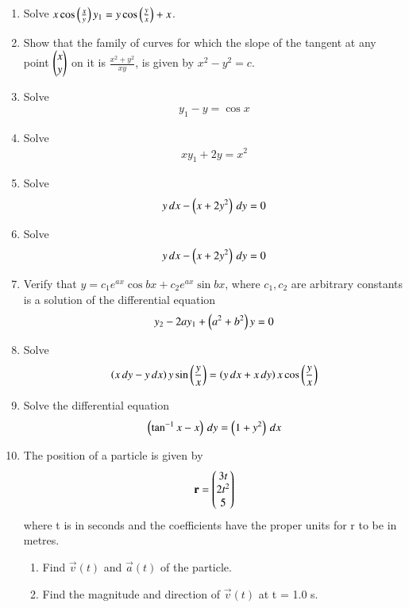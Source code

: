 \begin{enumerate}[label=\arabic*.,ref=\thesubsection.\theenumi]
\item Solve $x \cos\left(\frac{x}{y}\right)y_1 = y\cos\left(\frac{y}{x}\right)+x$.
\item Show that the family of curves for which the slope of the tangent at any point $\begin{pmatrix}x\\y\end{pmatrix}$ on it is $\frac{x^2+y^2}{xy}$, is given by $x^2-y^2 = c$.
%
%
\item Solve 
%
\begin{align}
y_1  - y = \cos x
\end{align}
%
\item Solve 
%
\begin{align}
xy_1  + 2y = x^2
\end{align}
%
\item Solve
%
\begin{align}
y\, dx - \left(x+2y^2\right)\, dy = 0
\end{align}
%
\item Solve
%
\begin{align}
y\, dx - \left(x+2y^2\right)\, dy = 0
\end{align}
%
\item Verify that $y = c_1e^{ax}\cos bx + c_2 e^{ax}\sin bx$, where $c_1,c_2$ are arbitrary constants is a solution of the differential equation
%
\begin{align}
y_2 - 2ay_1 +\left(a^2+b^2\right) y = 0
\end{align}
%
\item Solve
%
\begin{align}
\left(x\,dy-y\,dx\right)y\sin\left(\frac{y}{x}\right) = \left(y\, dx + x\, dy\right)x\cos\left(\frac{y}{x}\right)
\end{align}
%
\item Solve the differential equation
%
\begin{align}
\left(\tan^{-1}x - x\right)\, dy = \left(1+y^2\right)\, dx
\end{align}
\item The position of a particle is given by
\begin{align}
\mathbf{r} = \begin{pmatrix}3t\\2t^2\\5\end{pmatrix}
\end{align}
where t is in seconds and the coefficients have the proper units for r to be in metres. 
\begin{enumerate}
\item  Find $\vec{v}(t)$ and $\vec{a}(t)$ of the particle. 
\item  Find the magnitude and direction of $\vec{v}(t)$ at t = 1.0 s.
\end{enumerate}

\end{enumerate}
